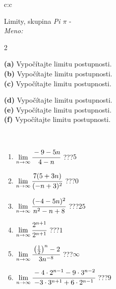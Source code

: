 \documentclass[10pt]{report}
\begin{document}
\newpage
\thispagestyle{empty}
\begin{tabular}{c:c}
\begin{minipage}[c][104.5mm][t]{0.5\linewidth}
\begin{center}
\vspace{5mm}
{\huge Limity, skupina \textit{Pi $\pi$} -}\\[5mm]
\textit{Meno:}\phantom{xxxxxxxxxxxxxxxxxxxxxxxxxxxxxxxxxxxxxxxxxxxxxxxxxxxxxxxxxxxxxxxxx}\\[5mm]
\begin{minipage}{0.95\linewidth}
\begin{center}
{\small \begin{multicols}{2} \raggedright
\textbf{(a)} Vypočítajte limitu postupnosti. \\[1mm]
\textbf{(b)} Vypočítajte limitu postupnosti. \\[1mm]
\textbf{(c)} Vypočítajte limitu postupnosti. \par \columnbreak
\textbf{(d)} Vypočítajte limitu postupnosti. \\[1mm]
\textbf{(e)} Vypočítajte limitu postupnosti. \\[1mm]
\textbf{(f)} Vypočítajte limitu postupnosti.
\end{multicols}
}
\end{center}
\end{minipage}
\\[1mm]
\begin{minipage}{0.79\linewidth}
\begin{center}
\begin{varwidth}{\linewidth}
\setlength{\itemsep}{0pt}
\begin{enumerate}
\footnotesizerr
\item $\lim\limits_{n\to\infty}\cfrac{-9-5n}{4-n}$\quad \dotfill\; ???\;\dotfill \quad $5$
\item $\lim\limits_{n\to\infty}\cfrac{7(5+3n)}{(-n+3)^2}$\quad \dotfill\; ???\;\dotfill \quad $0$
\item $\lim\limits_{n\to\infty}\cfrac{(-4-5n)^2}{n^2-n+8}$\quad \dotfill\; ???\;\dotfill \quad $25$
\item $\lim\limits_{n\to\infty}\cfrac{2^{n+1}}{2^{n+1}}$\quad \dotfill\; ???\;\dotfill \quad $1$
\item $\lim\limits_{n\to\infty}\cfrac{\left(\frac{1}{2}\right)^n -2}{3n^{-8}}$\quad \dotfill\; ???\;\dotfill \quad $\infty$
\item $\lim\limits_{n\to\infty}\cfrac{-4\cdot 2^{n-1}-9\cdot 3^{n-2}}{-3\cdot 3^{n+1}+6\cdot 2^{n-1}}$\quad \dotfill\; ???\;\dotfill \quad $9$

\end{enumerate}
\end{varwidth}
\end{center}
\end{minipage}
\end{center}
\end{minipage}
\end{tabular}
\end{document}
